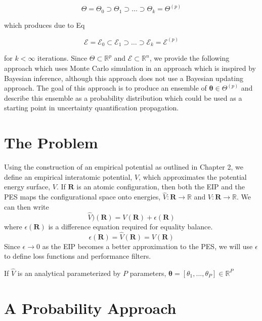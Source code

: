 \begin{equation}
    \Theta = \Theta_0 \supset \Theta_1 \supset \hdots \supset \Theta_k = \Theta^{(p)}
\end{equation}

which produces due to Eq %

\begin{equation}
    \mathcal{E} = \mathcal{E}_0 \subset \mathcal{E}_1 \supset \hdots \supset \mathcal{E}_k = \mathcal{E}^{(p)}
\end{equation}

for $k < \infty$ iterations.  Since $\Theta \subset \mathbb{R}^p$ and $\mathcal{E} \subset \mathbb{R}^n$, we provide the following approach which uses Monte Carlo simulation in an approach which is inspired by Bayesian inference, although this approach does not use a Bayesian updating approach.  The goal of this approach is to produce an ensemble of $\bm{\theta}\in \Theta^{(p)}$ and describe this ensemble as a probability distribution which could be used as a starting point in uncertainty quantification propagation.

\section{The Problem}

Using the construction of an empirical potential as outlined in Chapter 2, we define an empirical interatomic potential, $\hat{V}$, which approximates the potential energy surface, $V$.
If $\bm{R}$ is an atomic configuration, then both the EIP and the PES maps the configurational space onto energies, $\hat{V}:\bm{R} \rightarrow \mathbb{R}$ and $V:\bm{R} \rightarrow \mathbb{R}$.
We can then write
\begin{equation}
    \hat{V})(\bm{R}) = V(\bm{R}) + \epsilon(\bm{R})
\end{equation}
where $\epsilon(\bm{R})$ is a difference equation required for equality balance.
\begin{equation}
    \epsilon(\bm{R}) = \hat{V}(\bm{R}) = V(\bm{R})
\end{equation}
Since ${\epsilon \rightarrow 0}$ as the EIP becomes a better approximation to the PES, we will use $\epsilon$ to define loss functions and performance filters.

If $\hat{V}$ is an analytical parameterized by $P$ parameters, $\bm{\theta}=[\theta_1,...,\theta_P]\in\mathbb{R}^P$

\section{A Probability Approach}

